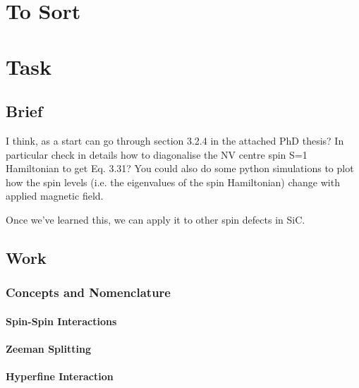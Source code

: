 \chapter{To Sort}



















\chapter{Task}
\section{Brief}

I think, as a start can go through section 3.2.4 in the attached PhD thesis? In particular check in details how to diagonalise the NV centre spin S=1 Hamiltonian to get Eq. 3.31?
You could also do some python simulations to plot how the spin levels (i.e. the eigenvalues of the spin Hamiltonian) change with applied magnetic field.

Once we've learned this, we can apply it to other spin defects in SiC.

\section{Work}
\subsection{Concepts and Nomenclature}
\subsubsection{Spin-Spin Interactions}
\subsubsection{Zeeman Splitting}
\subsubsection{Hyperfine Interaction}
